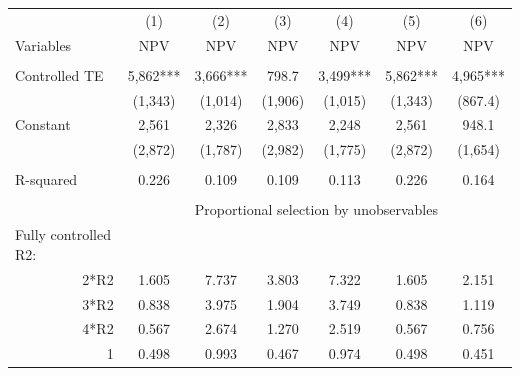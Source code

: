 \begin{tabular}{rcccccc}
\toprule
\toprule
\multicolumn{1}{l}{} & (1)   & (2)   & (3)   & (4)   & (5)   & (6) \\
\multicolumn{1}{l}{Variables} & NPV   & NPV   & NPV   & NPV   & NPV   & NPV \\
\midrule
\multicolumn{1}{l}{} &       &       &       &       &       &  \\
\multicolumn{1}{l}{Controlled TE} & 5,862*** & 3,666*** & 798.7 & 3,499*** & 5,862*** & 4,965*** \\
\multicolumn{1}{l}{} & (1,343) & (1,014) & (1,906) & (1,015) & (1,343) & (867.4) \\
\multicolumn{1}{l}{Constant} & 2,561 & 2,326 & 2,833 & 2,248 & 2,561 & 948.1 \\
\multicolumn{1}{l}{} & (2,872) & (1,787) & (2,982) & (1,775) & (2,872) & (1,654) \\
\multicolumn{1}{l}{} &       &       &       &       &       &  \\
\midrule
\multicolumn{1}{l}{R-squared} & 0.226 & 0.109 & 0.109 & 0.113 & 0.226 & 0.164 \\
      &       &       &       &       &       &  \\
\midrule
      & \multicolumn{6}{c}{Proportional selection by unobservables} \\
\midrule
\multicolumn{1}{l}{Fully controlled R2:} &       &       &       &       &       &  \\
2*R2  & 1.605 & 7.737 & 3.803 & 7.322 & 1.605 & 2.151 \\
3*R2  & 0.838 & 3.975 & 1.904 & 3.749 & 0.838 & 1.119 \\
4*R2  & 0.567 & 2.674 & 1.270 & 2.519 & 0.567 & 0.756 \\
1     & 0.498 & 0.993 & 0.467 & 0.974 & 0.498 & 0.451 \\
\bottomrule
\bottomrule
\end{tabular}%